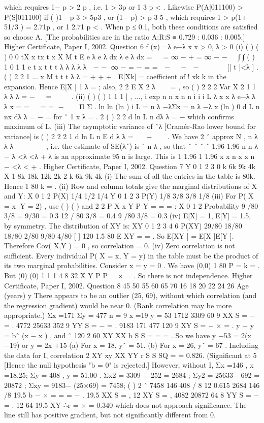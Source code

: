\documentclass[a4paper,12pt]{article}
\begin{document}
which requires 1− p > 2 p , i.e. 1 > 3p or 1
3 p < .
Likewise P(A|011100) > P(S|011100) if ( )1− p 3 > 5p3 , or (1− p) > p 3 5 , which
requires 1 > p(1+ 51/3 ) = 2.71p , or 1
2.71
p < .
When p ≤ 0.1, both these conditions are satisfied so choose A.
[The probabilities are in the ratio A:R:S ≡ 0.729 : 0.036 : 0.005.]
Higher Certificate, Paper I, 2002. Question 6
f (x) =λ e−λ x x > 0, λ > 0
(i) ( ) ( )
0 0
tX x tx t x
X M t E e λ e λ dx λ e λ dx =   = ∞ − + = ∞ − −   ∫ ∫
( ) 1
0
1 1
e t x t
t t
λ λ
λ λ λ
 − − ∞ − = − = =  −   −  −      
[| t |<λ ] .
( )
2
2 1 ... x
M t t t
λ λ
= + + + .
E[Xk] = coefficient of
!
xk
k
in the expansion.
Hence E[X ] 1
λ
= ; also, 2
2
E X 2
λ
  = , so ( )
2
2 2
Var X 2 1 1
λ λ λ
= −   =  
 
.
(ii) ( ) ( ) 1
1 1
| , ..., i exp
n n
x n
n i
i i
L λ x x λ e−λ λ λ x
= =
  = = − 
 
Π Σ .
ln ln (ln ) i L = n λ −λΣx = n λ −λ x
(ln )
0
d L n nx
dλ λ
= − = for ˆ 1
x
λ = .
2 ( )
2 2
d ln L n
dλ λ
= − which confirms maximum of L.
(iii) The asymptotic variance of ˆλ [Cramér-Rao lower bound for variance] is
( )
2
2
2
1
d ln L n
E
d
λ
λ
=
 
− 
 
.
We have
2 ˆ approx N ,
n
λ λ λ
 
∼  
 
, i.e. the estimate of SE(λˆ) is
ˆ
n
λ , so that
ˆ ˆ ˆ ˆ 1.96 1.96
n n
λ − λ <λ <λ + λ is an approximate 95%
n is large.
This is 1 1.96 1 1.96
x x n x x n
− <λ < + .
Higher Certificate, Paper I, 2002. Question 7
Y
0 1 2 3
0 k 6k 9k 4k
X 1 8k 18k 12k 2k
2 k 6k 9k 4k
(i) The sum of all the entries in the table is 80k. Hence 1
80
k = .
(ii) Row and column totals give the marginal distributions of X and Y:
X 0 1 2
P(X) 1/4 1/2 1/4
Y 0 1 2 3
P(Y) 1/8 3/8 3/8 1/8
(iii) For P( X = x |Y = 2) , use ( )
( )
and 2
2
P X x Y
P Y
= =
=
:
X 0 1 2
Probability 9 /80
3/8
= 9/30 = 0.3 12 / 80
3/8
= 0.4 9 /80
3/8
= 0.3
(iv) E[X] = 1, E[Y] = 1.5, by symmetry. The distribution of XY is:
XY 0 1 2 3 4 6
P(XY) 29/80 18/80 18/80 2/80 9/80 4/80
[ ] 120 1.5
80
E XY = = .
So E[XY ] = E[X ]E[Y ]. Therefore Cov( X,Y ) = 0 , so correlation = 0.
(iv) Zero correlation is not sufficient. Every individual P( X = x, Y = y) in the
table must be the product of its two marginal probabilities.
Consider x = y = 0 . We have (0,0) 1
80
P = k = . But (0) (0) 1 1 1
4 8 32 X Y P P = × = . So
there is not independence.
Higher Certificate, Paper I, 2002. Question 8
45
50
55
60
65
70
16 18 20 22 24 26
Age (years)
y
There appears to be an outlier (25, 69), without which correlation (and the regression
gradient) would be near 0. (Rank correlation may be more appropriate.)
Σx =171 Σy = 477 n = 9 x =19 y = 53
1712 3309 60
9 XX S = − = .
4772 25633 352
9 YY S = − = . 9183 171 477 120
9 XY S = − × = .
y − y = bˆ (x − x ) , and ˆ 120 2
60
XY
XX
b S
S
= = = .
So we have y −53 = 2(x −19) or y = 2x +15
(a) For x = 18, yˆ = 51. (b) For x = 26, yˆ = 67 .
Including the data for I, correlation
2
XY
xy
XX YY
r S
S SQ
= = 0.826. (Significant at 5%
[Hence the null hypothesis "b = 0" is rejected.]
However, without I, Σx =146 , x =18.25; Σy = 408 , y = 51.00 .
Σx2 = 3309 − 252 = 2684 ; Σy2 = 25633− 692 = 20872 ;
Σxy = 9183− (25×69) = 7458; ( )
2
ˆ 7458 146 408 / 8 12 0.615
2684 146 /8 19.5
b
− ×
= = =
−
.
19.5 XX S = , 12 XY S = ,
4082 20872 64
8 YY S = − = .
12
64 19.5 XY ∴r =
×
= 0.340 which does not approach significance. The line still has
positive gradient, but not significantly different from 0.
\end{document}
